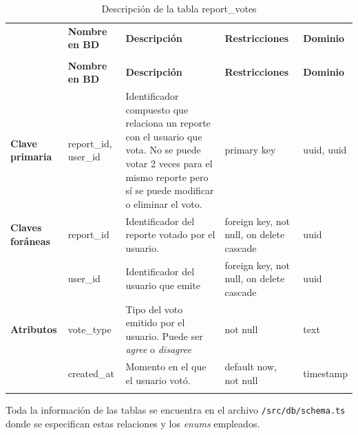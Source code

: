 
\renewcommand{\arraystretch}{1.35}
\setlength{\tabcolsep}{3pt}
\small

\begin{longtable}{|
>{\raggedright\arraybackslash}p{1.9cm}|
>{\raggedright\arraybackslash}p{2.7cm}|
>{\raggedright\arraybackslash}p{4.9cm}|
>{\raggedright\arraybackslash}p{2.7cm}|
>{\raggedright\arraybackslash}p{2.1cm}|
}
\hline

\rowcolor[gray]{0.75}
\multicolumn{5}{|c|}{\textbf{Votos de reportes}} \\
\hline

 & \textbf{Nombre en BD} & \textbf{Descripción} & \textbf{Restricciones} & \textbf{Dominio} \\
\hline
\endfirsthead

\hline
\rowcolor[gray]{0.75}
\multicolumn{5}{|c|}{\textbf{Votos de reportes}} \\
\hline

 & \textbf{Nombre en BD} & \textbf{Descripción} & \textbf{Restricciones} & \textbf{Dominio} \\
\hline
\endhead

\textbf{Clave primaria}
& report\_\allowbreak id, user\_\allowbreak id
& Identificador compuesto que relaciona un reporte con el usuario que vota. No se puede votar 2 veces para el mismo reporte pero sí se puede modificar o eliminar el voto. 
& primary key
& uuid, uuid \\
\hline

\textbf{Claves foráneas}
& report\_\allowbreak id
& Identificador del reporte votado por el usuario.
& foreign key, not null, on delete cascade
& uuid \\
\cline{2-5}

& user\_\allowbreak id
& Identificador del usuario que emite
& foreign key, not null, on delete cascade
& uuid \\
\hline

\textbf{Atributos}
& vote\_\allowbreak type
& Tipo del voto emitido por el usuario. Puede ser \textit{agree} o \textit{disagree}
& not null
& text \\
\cline{2-5}

& created\_\allowbreak at
& Momento en el que el usuario votó.
& default now, not null
& timestamp \\
\hline

\caption{Descripción de la tabla report\_votes}
\end{longtable}

Toda la información de las tablas se encuentra en el archivo \texttt{/src/db/schema.ts} donde se especifican estas relaciones y los \textit{enums} empleados. 


